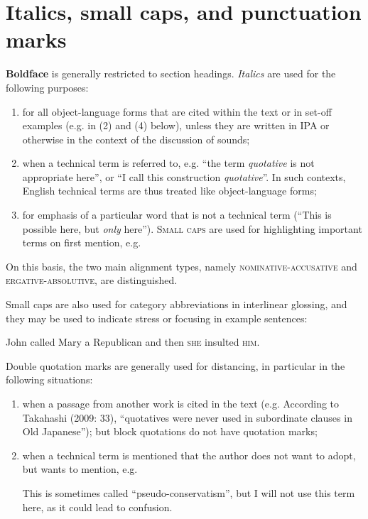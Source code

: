 \section{Italics, small caps, and punctuation marks}

\textbf{Boldface} is generally restricted to section headings.
\textit{Italics} are used for the following purposes:
\begin{enumerate}
\item for all object-language forms that are cited within the text or in set-off examples (e.g. in (2) and (4) below), unless they are written in IPA or otherwise in the context of the discussion of sounds;
\item  when a technical term is referred to, e.g. ``the term \textit{quotative} is not appropriate here'', or ``I call this construction \textit{quotative}''. In such contexts, English technical terms are thus treated like object-language forms;
\item for emphasis of a particular word that is not a technical term (``This is possible here, but \textit{only} here'').
\textsc{Small caps} are used for highlighting important terms on first mention, e.g.
\end{enumerate}
\ea
On this basis, the two main alignment types, namely \textsc{nominative-accusative} and \textsc{ergative-absolutive}, are distinguished.
\z

Small caps are also used for category abbreviations in interlinear glossing, and they may be used to indicate stress or focusing in example sentences:

\ea 
John called Mary a Republican and then \textsc{she} insulted \textsc{him}.
\z



Double quotation marks are generally used for distancing, in particular in the following situations:
\begin{enumerate}
 \item  when a passage from another work is cited in the text (e.g. According to Takahashi (2009: 33), ``quotatives were never used in subordinate clauses in Old Japanese''); but block quotations do not have quotation marks;
\item when a technical term is mentioned that the author does not want to adopt, but wants to mention, e.g.

\ea
This is sometimes called ``pseudo-conservatism'', but I will not use this term here, as it could lead
to confusion.
\z


\end{enumerate}


